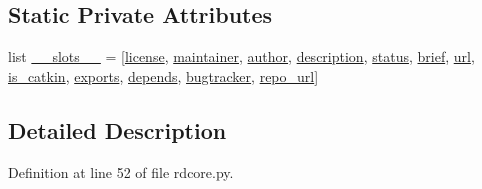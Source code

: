\subsection*{Static Private Attributes}
\begin{DoxyCompactItemize}
\item 
list \hyperlink{classrosdoc__lite_1_1rdcore_1_1PackageInformation_a59d7eac614a4f3771c7c771e18d116fe}{\+\_\+\+\_\+slots\+\_\+\+\_\+} = \mbox{[}\textquotesingle{}\hyperlink{classrosdoc__lite_1_1rdcore_1_1PackageInformation_a64ff5843063bf71f16f4cdab4d1bbd18}{license}\textquotesingle{}, \textquotesingle{}\hyperlink{classrosdoc__lite_1_1rdcore_1_1PackageInformation_a1972daa7cde3c680c98bb054eda418a5}{maintainer}\textquotesingle{}, \textquotesingle{}\hyperlink{classrosdoc__lite_1_1rdcore_1_1PackageInformation_a5c27cda0ae2ab8203fb74d3d5e8d0ed2}{author}\textquotesingle{}, \textquotesingle{}\hyperlink{classrosdoc__lite_1_1rdcore_1_1PackageInformation_a579d2604f2cfac815e8e3072c0833360}{description}\textquotesingle{}, \textquotesingle{}\hyperlink{classrosdoc__lite_1_1rdcore_1_1PackageInformation_a0e5a0d40d1d31760edff0121a6ce2c7f}{status}\textquotesingle{}, \textquotesingle{}\hyperlink{classrosdoc__lite_1_1rdcore_1_1PackageInformation_aea176e3d7ce96d59c465aa7ea95cba0f}{brief}\textquotesingle{}, \textquotesingle{}\hyperlink{classrosdoc__lite_1_1rdcore_1_1PackageInformation_a0ef2dba844b386398740004bc74d1bce}{url}\textquotesingle{}, \textquotesingle{}\hyperlink{classrosdoc__lite_1_1rdcore_1_1PackageInformation_a62a03a706ae759bc4e44fce551846df8}{is\+\_\+catkin}\textquotesingle{}, \textquotesingle{}\hyperlink{classrosdoc__lite_1_1rdcore_1_1PackageInformation_aa8aedabc1d5a9d4876b1a52560784272}{exports}\textquotesingle{}, \textquotesingle{}\hyperlink{classrosdoc__lite_1_1rdcore_1_1PackageInformation_a6ba9c49b465bee65c40b4561b7f58ee5}{depends}\textquotesingle{}, \textquotesingle{}\hyperlink{classrosdoc__lite_1_1rdcore_1_1PackageInformation_a587611359b64f8680f3dc88110406e38}{bugtracker}\textquotesingle{}, \textquotesingle{}\hyperlink{classrosdoc__lite_1_1rdcore_1_1PackageInformation_a5a276ff51a0190a30dc47b1f68573718}{repo\+\_\+url}\textquotesingle{}\mbox{]}
\end{DoxyCompactItemize}


\subsection{Detailed Description}


Definition at line 52 of file rdcore.\+py.



